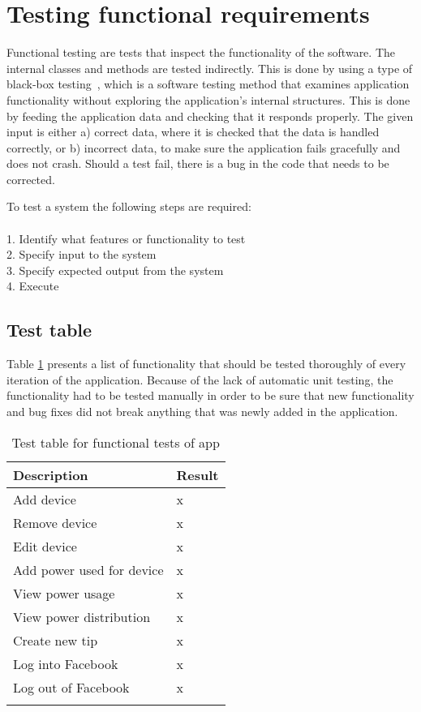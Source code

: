 \newpage
\section{Testing functional requirements}
\label{sec:funcTest}
Functional testing are tests that inspect the functionality of the software. The internal classes and methods are tested indirectly. This is done by using a type of black-box testing~\cite{blackbox}, which is a software testing method that examines application functionality without exploring the application's internal structures. This is done by feeding the application data and checking that it responds properly. The given input is either a) correct data, where it is checked that the data is handled correctly, or b) incorrect data, to make sure the application fails gracefully and does not crash. Should a test fail, there is a bug in the code that needs to be corrected.

To test a system the following steps are required:\\\\
1. Identify what features or functionality to test\\
2. Specify input to the system\\
3. Specify expected output from the system\\
4. Execute

\subsection{Test table}
Table \ref{tab:testTable} presents a list of functionality that should be tested thoroughly of every iteration of the application. Because of the lack of automatic unit testing, the functionality had to be tested manually in order to be sure that new functionality and bug fixes did not break anything that was newly added in the application.

\begin{table}[H]
\centering
{}
\begin{tabular}{|l|l|}
\textbf{Description} & \textbf{Result}\\\hline 
\arrayrulecolor{lightgray}
Add device&x\\ \cline{1-2}
Remove device&x\\ \cline{1-2}
Edit device&x\\ \cline{1-2}
Add power used for device&x\\ \cline{1-2}
View power usage&x\\ \cline{1-2}
View power distribution&x\\ \cline{1-2}
Create new tip&x\\ \cline{1-2}
Log into Facebook&x\\ \cline{1-2}
Log out of Facebook&x\\\arrayrulecolor{black}
\hline
\end{tabular}
\caption{Test table for functional tests of app}
\label{tab:testTable}
\end{table}
